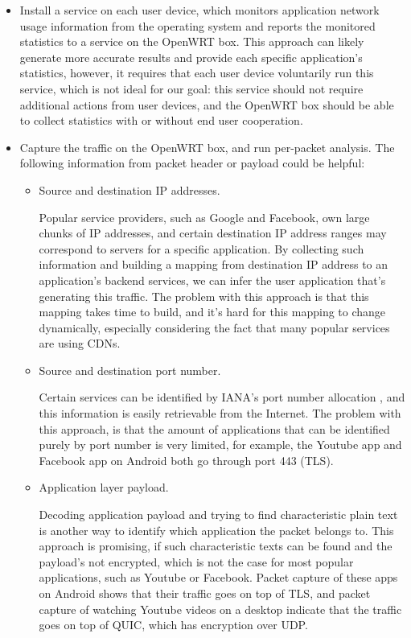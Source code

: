 \begin{itemize}

\item Install a service on each user device, which monitors application network usage information from the operating system and reports the monitored statistics to a service on the OpenWRT box. This approach can likely generate more accurate results and provide each specific application's statistics, however, it requires that each user device voluntarily run this service, which is not ideal for our goal: this service should not require additional actions from user devices, and the OpenWRT box should be able to collect statistics with or without end user cooperation.

\item Capture the traffic on the OpenWRT box, and run per-packet analysis. The following information from packet header or payload could be helpful:

  \begin{itemize}

  \item Source and destination IP addresses. 

  Popular service providers, such as Google and Facebook, own large chunks of IP addresses, and certain destination IP address ranges may correspond to servers for a specific application. By collecting such information and building a  mapping from destination IP address to an application's backend services, we can infer the user application that's generating this traffic. The problem with this approach is that this mapping takes time to build, and it's hard for this mapping to change dynamically, especially considering the fact that many popular services are using CDNs.

  \item Source and destination port number. 

  Certain services can be identified by IANA's port number allocation \cite{PortAssignment}, and this information is easily retrievable from the Internet. The problem with this approach, is that the amount of applications that can be identified purely by port number is very limited, for example, the Youtube app and Facebook app on Android both go through port 443 (TLS).

  \item Application layer payload. 

  Decoding application payload and trying to find characteristic plain text is another way to identify which application the packet belongs to. This approach is promising, if such characteristic texts can be found and the payload's not encrypted, which is not the case for most popular applications, such as Youtube or Facebook. Packet capture of these apps on Android shows that their traffic goes on top of TLS, and packet capture of watching Youtube videos on a desktop indicate that the traffic goes on top of QUIC, which has encryption over UDP.


\end{itemize}
\end{itemize}
